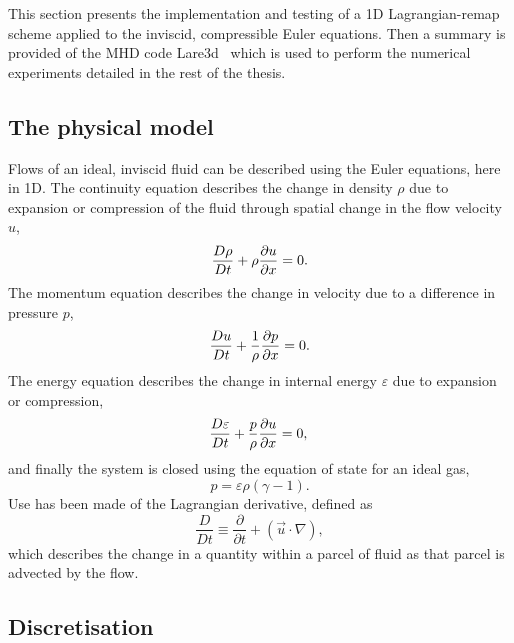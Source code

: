 This section presents the implementation and testing of a 1D Lagrangian-remap scheme applied to the inviscid, compressible Euler equations. Then a summary is provided of the MHD code Lare3d~\cite{arberStaggeredGridLagrangian2001} which is used to perform the numerical experiments detailed in the rest of the thesis. 

\subsection{The physical model}

Flows of an ideal, inviscid fluid can be described using the Euler equations, here in 1D. The continuity equation describes the change in density $\rho$ due to expansion or compression of the fluid through spatial change in the flow velocity $u$,
\begin{equation}
  \frac{D \rho}{Dt} + \rho\frac{\partial u}{\partial x} = 0.\\
  \label{eqn-Lare1d-density}
\end{equation}
The momentum equation describes the change in velocity due to a difference in pressure $p$,
\begin{equation}
  \frac{D u}{Dt} + \frac{1}{\rho}\frac{\partial p}{\partial x} = 0.\\
  \label{eqn-Lare1d-velocity}
\end{equation}
The energy equation describes the change in internal energy $\varepsilon$ due to expansion or compression,
\begin{equation}
  \frac{D \varepsilon}{Dt} + \frac{p}{\rho}\frac{\partial u}{\partial x} = 0,\\
  \label{eqn-Lare1d-energy}
\end{equation}
and finally the system is closed using the equation of state for an ideal gas,
\begin{equation}
  p = \varepsilon\rho(\gamma - 1).
  \label{eqn-Lare1d-equation-of-state}
\end{equation}
Use has been made of the Lagrangian derivative, defined as
\begin{equation}
  \frac{D }{Dt} \equiv \frac{\partial}{\partial t} + (\vec{u} \cdot \nabla),
\end{equation}
which describes the change in a quantity within a parcel of fluid as that parcel is advected by the flow. 

\subsection{Discretisation} 

